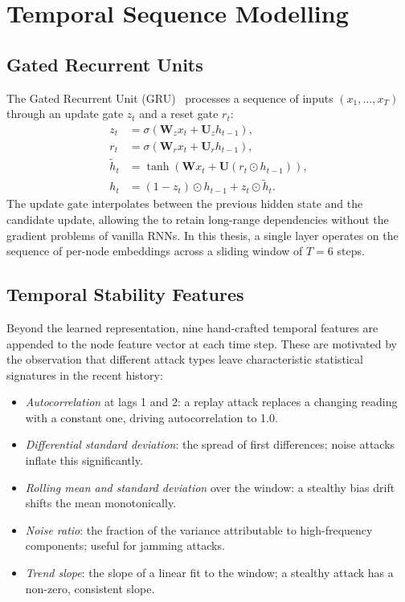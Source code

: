 \section{Temporal Sequence Modelling}
\label{sec:temporal_background}

\subsection{Gated Recurrent Units}

The Gated Recurrent Unit (GRU)~\cite{cho2014gru} processes a sequence of inputs
$(x_1, \ldots, x_T)$ through an update gate $z_t$ and a reset gate
$r_t$:
\begin{align}
  z_t &= \sigma(\mathbf{W}_z x_t + \mathbf{U}_z h_{t-1}), \\
  r_t &= \sigma(\mathbf{W}_r x_t + \mathbf{U}_r h_{t-1}), \\
  \tilde{h}_t &= \tanh(\mathbf{W} x_t + \mathbf{U}(r_t \odot h_{t-1})), \\
  h_t &= (1 - z_t) \odot h_{t-1} + z_t \odot \tilde{h}_t.
\end{align}
The update gate interpolates between the previous hidden state and
the candidate update, allowing the \gru{} to retain long-range
dependencies without the gradient problems of vanilla RNNs. In this
thesis, a single \gru{} layer operates on the sequence of per-node
\gnn{} embeddings across a sliding window of $T = 6$ steps.

\subsection{Temporal Stability Features}

Beyond the learned \gru{} representation, nine hand-crafted temporal
features are appended to the node feature vector at each time step.
These are motivated by the observation that different attack types
leave characteristic statistical signatures in the recent history:

\begin{itemize}
  \item \emph{Autocorrelation} at lags 1 and 2: a replay attack
    replaces a changing reading with a constant one, driving
    autocorrelation to 1.0.
  \item \emph{Differential standard deviation}: the spread of
    first differences; noise attacks inflate this significantly.
  \item \emph{Rolling mean and standard deviation} over the window:
    a stealthy bias drift shifts the mean monotonically.
  \item \emph{Noise ratio}: the fraction of the variance
    attributable to high-frequency components; useful for jamming
    attacks.
  \item \emph{Trend slope}: the slope of a linear fit to the window;
    a stealthy attack has a non-zero, consistent slope.
\end{itemize}

